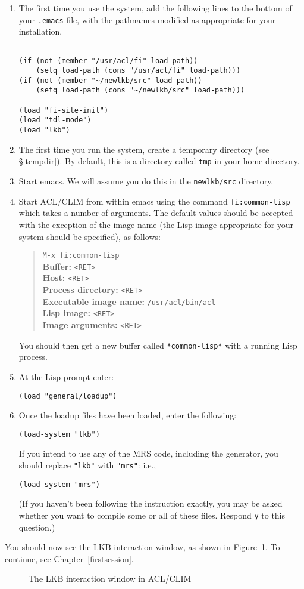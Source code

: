 \documentclass[12pt]{report}
\newcommand{\filename}[1]{{\tt #1}}
\begin{document}
\begin{enumerate}
\item The first time you use the system,
add the following lines to the bottom of your \filename{.emacs}
file, with the pathnames modified as appropriate for your
installation.
\begin{verbatim}

(if (not (member "/usr/acl/fi" load-path))
    (setq load-path (cons "/usr/acl/fi" load-path)))
(if (not (member "~/newlkb/src" load-path))
    (setq load-path (cons "~/newlkb/src" load-path)))
	
(load "fi-site-init")
(load "tdl-mode")
(load "lkb")
\end{verbatim}
\item The first time you run the system,
create a temporary directory (see \S\ref{tempdir}).  By default, this is
a directory called \filename{tmp} in your home directory.
\item Start emacs.  We will assume you
do this in the \filename{newlkb/src} directory.
\item Start ACL/CLIM from within emacs using the 
command \verb+fi:common-lisp+ which takes a number
of arguments. The
default values should be accepted with the exception
of the image name (the Lisp image appropriate for your
system should be specified), as follows:
\begin{quote}
\verb+M-x fi:common-lisp+\\
{\bf Buffer:} \verb+<RET>+\\
{\bf Host:} \verb+<RET>+\\
{\bf Process directory:} \verb+<RET>+\\
{\bf Executable image name:} \verb+/usr/acl/bin/acl+\\
{\bf Lisp image:}  \verb+<RET>+\\
{\bf Image arguments:}  \verb+<RET>+
\end{quote}
You should then get a new buffer called \verb+*common-lisp*+ with
a running Lisp process.  
\item At the Lisp prompt enter:
\begin{verbatim}
(load "general/loadup") 
\end{verbatim}
\item Once the loadup files have been loaded, enter the following:
\begin{verbatim}
(load-system "lkb")
\end{verbatim}
If you intend to use any of the MRS code, including the generator,
you should replace \verb+"lkb"+ with \verb+"mrs"+: i.e.,
\begin{verbatim}
(load-system "mrs")
\end{verbatim}
(If you haven't been following the instruction exactly, you may be asked whether
you want to compile some or all of these files.  Respond {\tt y} to this
question.)
\end{enumerate}
You
should now see the LKB interaction window, as shown in 
Figure~\ref{lkbtop-unix}.
To continue, see Chapter~\ref{firstsession}.
\begin{figure}
\caption{The LKB interaction window in ACL/CLIM}
\label{lkbtop-unix}
\end{figure}
\end{document}
